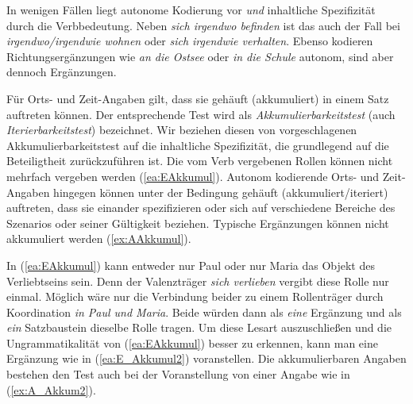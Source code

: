 \ea
{}\label{ea:verliebtunddasinLondon}
\label{ex:befindetsichunddasinLondon} 
\z 
\z 

In wenigen Fällen liegt autonome Kodierung vor \textit{und} inhaltliche Spezifizität durch die Verbbedeutung. Neben \textit{sich irgendwo befinden} ist das auch der Fall bei \textit{irgendwo/irgendwie wohnen} oder \textit{sich irgendwie verhalten}. Ebenso kodieren Richtungsergänzungen wie \textit{an die Ostsee} oder \textit{in die Schule} autonom, sind aber dennoch Ergänzungen.

Für Orts- und Zeit-Angaben gilt, dass sie gehäuft (akkumuliert) in einem Satz auftreten können. Der entsprechende Test wird als \textit{Akkumulierbarkeitstest} (auch \textit{Iterierbarkeitstest}) bezeichnet. Wir beziehen diesen \ua von \citet[15]{FourquetGrunig1971} vorgeschlagenen Akkumulierbarkeitstest auf die inhaltliche Spezifizität, die grundlegend auf die Beteiligtheit zurückzuführen ist. Die vom Verb vergebenen Rollen können nicht mehrfach vergeben werden (\ref{ea:EAkkumul}). Autonom kodierende Orts- und Zeit-Angaben hingegen können unter der Bedingung gehäuft (akkumuliert/iteriert) auftreten, dass sie einander spezifizieren oder sich auf verschiedene Bereiche des Szenarios oder seiner Gültigkeit beziehen. Typische Ergänzungen können nicht akkumuliert werden (\ref{ex:AAkkumul}).

\ea 
{}\label{ea:EAkkumul}  
\label{ex:AAkkumul} 
\z  
\z 

In (\ref{ea:EAkkumul}) kann entweder nur Paul oder nur Maria das Objekt des Verliebtseins sein. Denn der Valenzträger \textit{sich verlieben} vergibt diese Rolle nur einmal. Möglich wäre nur die Verbindung beider zu einem Rollenträger durch Koordination \textit{in Paul und Maria}. Beide würden dann als \textit{eine} Ergänzung und als \textit{ein} Satzbaustein dieselbe Rolle tragen. Um diese Lesart auszuschließen und die Ungrammatikalität von (\ref{ea:EAkkumul}) besser zu erkennen, kann man eine Ergänzung wie in (\ref{ea:E_Akkumul2}) voranstellen. Die akkumulierbaren Angaben bestehen den Test auch bei der Voranstellung von einer Angabe wie in (\ref{ex:A_Akkum2}).

\ea \label{ea:E_A_Akkum}
\label{ea:E_Akkumul2}  
\label{ex:A_Akkum2}
\z 
\z 

